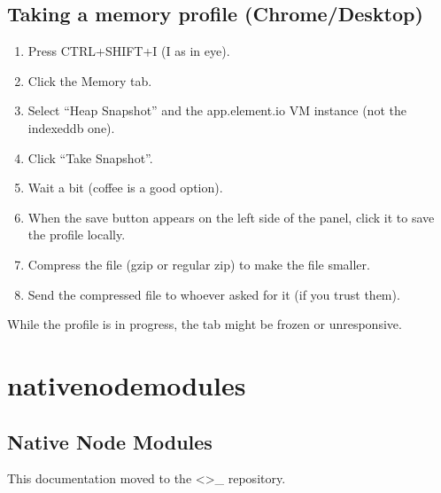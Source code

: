 \documentclass[letterpaper,10pt,openany,oneside,english]{sphinxmanual}
\begin{document}
\section{Taking a memory profile (Chrome/Desktop)}
\label{\detokenize{memory-profiles-and-leaks:taking-a-memory-profile-chrome-desktop}}\begin{enumerate}
%
\item {} 
\sphinxAtStartPar
Press CTRL+SHIFT+I (I as in eye).

\item {} 
\sphinxAtStartPar
Click the Memory tab.

\item {} 
\sphinxAtStartPar
Select “Heap Snapshot” and the app.element.io VM instance (not the indexeddb one).

\item {} 
\sphinxAtStartPar
Click “Take Snapshot”.

\item {} 
\sphinxAtStartPar
Wait a bit (coffee is a good option).

\item {} 
\sphinxAtStartPar
When the save button appears on the left side of the panel, click it to save the
profile locally.

\item {} 
\sphinxAtStartPar
Compress the file (gzip or regular zip) to make the file smaller.

\item {} 
\sphinxAtStartPar
Send the compressed file to whoever asked for it (if you trust them).

\end{enumerate}

\sphinxAtStartPar
While the profile is in progress, the tab might be frozen or unresponsive.


\chapter{native\sphinxhyphen{}node\sphinxhyphen{}modules}
\label{\detokenize{native-node-modules:native-node-modules}}\label{\detokenize{native-node-modules::doc}}

\section{Native Node Modules}
\label{\detokenize{native-node-modules:id1}}
\sphinxAtStartPar
This documentation moved to the  \textless{}\textgreater{}\textasciigrave{}\_ repository.
\end{document}
